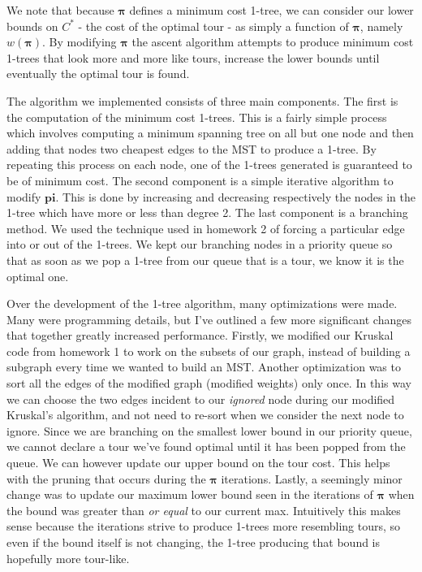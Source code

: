 \documentclass[11pt]{article}
\newcommand{\ve}[1]{\boldsymbol{#1}}
\begin{document}
	We note that because $\ve{\pi}$ defines a minimum cost 1-tree, we can consider our lower bounds on $C^*$ - the cost of the optimal tour - as simply a function of $\ve{\pi}$, namely $w(\ve{\pi})$. By modifying $\ve{\pi}$ the ascent algorithm attempts to produce minimum cost 1-trees that look more and more like tours, increase the lower bounds until eventually the optimal tour is found.
	
	The algorithm we implemented consists of three main components. The first is the computation of the minimum cost 1-trees. This is a fairly simple process which involves computing a minimum spanning tree on all but one node and then adding that nodes two cheapest edges to the MST to produce a 1-tree. By repeating this process on each node, one of the 1-trees generated is guaranteed to be of minimum cost. The second component is a simple iterative algorithm to modify $\ve{pi}$. This is done by increasing and decreasing respectively the nodes in the 1-tree which have more or less than degree 2. The last component is a branching method. We used the technique used in homework 2 of forcing a particular edge into or out of the 1-trees. We kept our branching nodes in a priority queue so that as soon as we pop a 1-tree from our queue that is a tour, we know it is the optimal one.
	
	Over the development of the 1-tree algorithm, many optimizations were made. Many were programming details, but I've outlined a few more significant changes that together greatly increased performance. Firstly, we modified our Kruskal code from homework 1 to work on the subsets of our graph, instead of building a subgraph every time we wanted to build an MST. Another optimization was to sort all the edges of the modified graph (modified weights) only once. In this way we can choose the two edges incident to our \emph{ignored} node during our modified Kruskal's algorithm, and not need to re-sort when we consider the next node to ignore. Since we are branching on the smallest lower bound in our priority queue, we cannot declare a tour we've found optimal until it has been popped from the queue. We can however update our upper bound on the tour cost. This helps with the pruning that occurs during the $\ve{\pi}$ iterations. Lastly, a seemingly minor change was to update our maximum lower bound seen in the iterations of $\ve{\pi}$ when the bound was greater than \emph{or equal} to our current max. Intuitively this makes sense because the iterations strive to produce 1-trees more resembling tours, so even if the bound itself is not changing, the 1-tree producing that bound is hopefully more tour-like.
	
\end{document}
